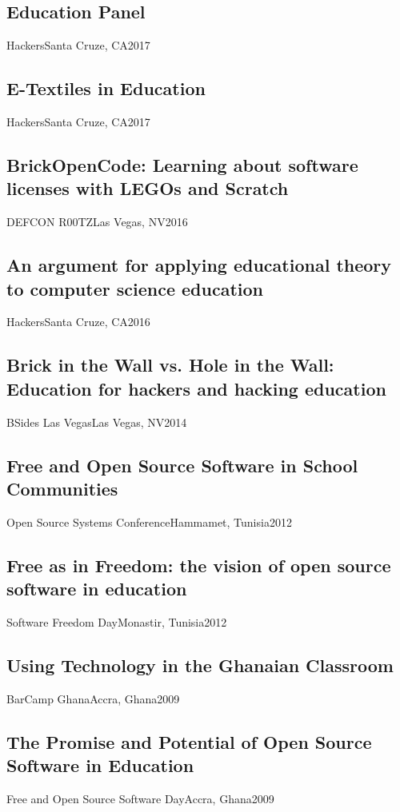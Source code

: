 \documentclass[../main.tex]{subfiles}
\begin{document}
\subsection{Education Panel}{Hackers}{Santa Cruze, CA}{2017}
	\hfill

\subsection{E-Textiles in Education}{Hackers}{Santa Cruze, CA}{2017}
	\hfill

	\subsection{BrickOpenCode: Learning about software licenses with LEGOs and Scratch}{DEFCON R00TZ}{Las Vegas, NV}{2016}
	\hfill

\subsection{An argument for applying educational theory to computer science education}{Hackers}{Santa Cruze, CA}{2016}
	\hfill

	\subsection{Brick in the Wall vs. Hole in the Wall: Education for hackers and hacking education}{BSides Las Vegas}{Las Vegas, NV}{2014}
	\hfill

	\subsection{Free and Open Source Software in School Communities}{Open Source Systems Conference}{Hammamet, Tunisia}{2012}
	\hfill

	\subsection{Free as in Freedom: the vision of open source software in education}{Software Freedom Day}{Monastir, Tunisia}{2012}
	\hfill

	\subsection{Using Technology in the Ghanaian Classroom}{BarCamp Ghana}{Accra, Ghana}{2009}
	\hfill

	\subsection{The Promise and Potential of Open Source Software in Education}{Free and Open Source Software Day}{Accra, Ghana}{2009}
	\hfill{}
\end{document}
